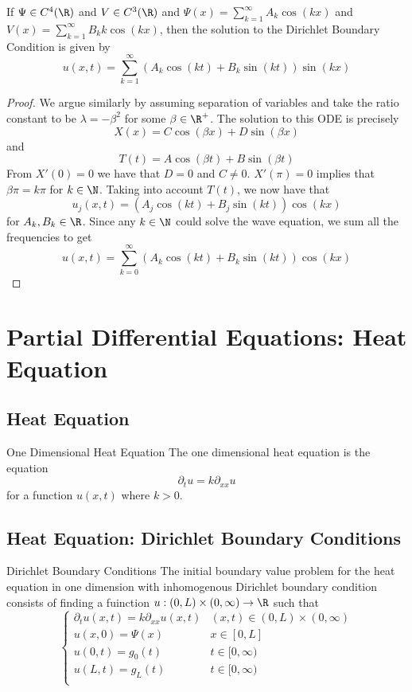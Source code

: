 \documentclass[a4paper]{article}
\begin{document}
\begin{prp}{}{} If $\Psi\in C^4(\R)$ and $V\in C^3(\R)$ and $\Psi(x)=\sum_{k=1}^\infty A_k\cos(kx)$ and $V(x)=\sum_{k=1}^\infty B_kk\cos(kx)$, then the solution to the Dirichlet Boundary Condition is given by $$u(x,t)=\sum_{k=1}^\infty\left(A_k\cos(kt)+B_k\sin(kt)\right)\sin(kx)$$ \tcbline
\begin{proof}
We argue similarly by assuming separation of variables and take the ratio constant to be $\lambda=-\beta^2$ for some $\beta\in\R^+$. The solution to this ODE is precisely $$X(x)=C\cos(\beta x)+D\sin(\beta x)$$ and $$T(t)=A\cos(\beta t)+B\sin(\beta t)$$ From $X'(0)=0$ we have that $D=0$ and $C\neq 0$. $X'(\pi)=0$ implies that $\beta\pi=k\pi$ for $k\in\N$. Taking into account $T(t)$, we now have that $$u_j(x,t)=(A_j\cos(kt)+B_j\sin(kt))\cos(kx)$$ for $A_k,B_k\in\R$. Since any $k\in\N$ could solve the wave equation, we sum all the frequencies to get $$u(x,t)=\sum_{k=0}^\infty(A_k\cos(kt)+B_k\sin(kt))\cos(kx)$$
\end{proof}
\end{prp}

\pagebreak
\section{Partial Differential Equations: Heat Equation}
\subsection{Heat Equation}
\begin{defn}{One Dimensional Heat Equation}{} The one dimensional heat equation is the equation $$\partial_tu=k\partial_{xx}u$$ for a function $u(x,t)$ where $k>0$. 
\end{defn}

\subsection{Heat Equation: Dirichlet Boundary Conditions}
\begin{defn}{Dirichlet Boundary Conditions}{} The initial boundary value problem for the heat equation in one dimension with inhomogenous Dirichlet boundary condition consists of finding a fuinction $u:(0,L)\times(0,\infty)\to\R$ such that $$\begin{cases}
\partial_{t}u(x,t)=k\partial_{xx}u(x,t) & (x,t)\in(0,L)\times(0,\infty)\\
u(x,0)=\Psi(x) & x\in[0,L]\\
u(0,t)=g_0(t) & t\in[0,\infty)\\
u(L,t)=g_L(t) & t\in[0,\infty)\\
\end{cases}$$
\end{defn}
\end{document}
